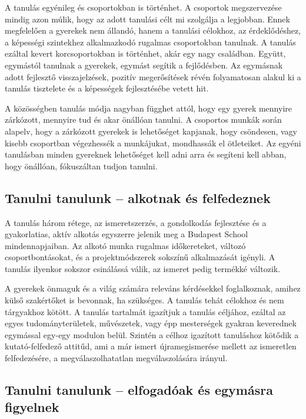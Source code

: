 A tanulás egyénileg és csoportokban is történhet. A csoportok megszervezése mindig azon múlik, hogy az adott tanulási célt mi szolgálja a legjobban. Ennek megfelelően a gyerekek nem állandó, hanem a tanulási célokhoz, az érdeklődéshez, a képességi szintekhez alkalmazkodó rugalmas csoportokban tanulnak. A tanulás ezáltal kevert korcsoportokban is történhet, akár egy nagy családban. Együtt, egymástól tanulnak a gyerekek, egymást segítik a fejlődésben. Az egymásnak adott fejlesztő visszajelzések, pozitív megerősítések révén folyamatosan alakul ki a tanulás tisztelete és a képességek fejlesztésébe vetett hit.

A közösségben tanulás módja nagyban függhet attól, hogy egy gyerek mennyire zárkózott, mennyire tud és akar önállóan tanulni. A csoportos munkák során alapelv, hogy a zárkózott gyerekek is lehetőséget kapjanak, hogy csöndesen, vagy kisebb csoportban végezhessék a munkájukat, mondhassák el ötleteiket. Az egyéni tanulásban minden gyereknek lehetőséget kell adni arra és segíteni kell abban, hogy önállóan, fókuszáltan tudjon tanulni.\vfill\eject

\subsection{Tanulni tanulunk -- alkotnak és felfedeznek}
A tanulás három rétege, az ismeretszerzés, a gondolkodás fejlesztése és a gyakorlatias, aktív alkotás egyszerre jelenik meg a Budapest School mindennapjaiban. Az alkotó munka rugalmas időkereteket, változó csoportbontásokat, és a projektmódszerek sokszínű alkalmazását igényli. A tanulás ilyenkor sokszor csinálássá válik, az ismeret pedig termékké változik.

A gyerekek önmaguk és a világ számára releváns kérdésekkel foglalkoznak, amihez külső szakértőket is bevonnak, ha szükséges. A tanulás tehát célokhoz és nem tárgyakhoz kötött. A tanulás tartalmát igazítjuk a tanulás céljához, ezáltal az egyes tudományterületek, művészetek, vagy épp mesterségek gyakran keverednek egymással egy-egy modulon belül. Szintén a célhoz igazított tanuláshoz kötődik a kutató-felfedező attitűd, ami a már ismert újramegismerése mellett az ismeretlen felfedezésére, a megválaszolhatatlan megválaszolására irányul.

\subsection{Tanulni tanulunk -- elfogadóak és egymásra figyelnek}

